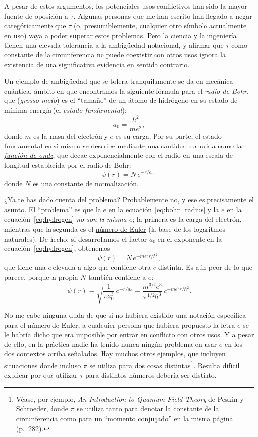 A pesar de estos argumentos, los potenciales usos conflictivos han sido la mayor fuente de oposición a $\tau$. Algunas personas que me han escrito han llegado a negar categóricamente que $\tau$ (o, presumiblemente, cualquier otro símbolo actualmente en uso) vaya a poder superar estos problemas. Pero la ciencia y la ingeniería tienen una elevada tolerancia a la ambigüedad notacional, y afirmar que $\tau$ como constante de la circunferencia no puede coexistir con otros usos ignora la existencia de una significativa evidencia en sentido contrario.

Un ejemplo de  ambigüedad que se tolera tranquilamente se da en mecánica cuántica, ámbito en que encontramos la siguiente fórmula para el  \emph{radio de Bohr}, que (\textit{grosso modo}) es el ``tamaño'' de un átomo de hidrógeno en su estado de mínima energía (el \emph{estado fundamental}):
\begin{equation}
  \label{eq:bohr_radius}
  a_0 = \frac{\hbar^2}{m e^2},
  \end{equation}
donde $m$ es la masa del electrón y $e$ es su carga. Por su parte, el estado fundamental en sí mismo se describe mediante una cantidad conocida como la \href{https://es.wikipedia.org/wiki/Función_de_onda}{\emph{función de onda}}, que decae exponencialmente con el radio en una escala de longitud establecida por el radio de Bohr:
\begin{equation}
\label{eq:hydrogen}
\psi(r) = N\,e^{-r/a_0},
\end{equation}
donde $N$ es una constante de normalización.

¿Ya te has dado cuenta del problema? Probablemente no, y ese es precisamente el asunto. El ``problema'' es que la $e$ en la ecuación~\eqref{eq:bohr_radius} y la $e$ en la ecuación~\eqref{eq:hydrogen} \emph{no son la misma $e$}; la primera es la carga del electrón, mientras que la segunda es el \href{https://es.wikipedia.org/wiki/N%C3%BAmero_e}{número de Euler} (la base de los logaritmos naturales). De hecho, si desarrollamos el factor $a_0$ en el exponente en la ecuación~\eqref{eq:hydrogen}, obtenemos
\[
\psi(r) = N\,e^{-m e^2 r/\hbar^2},
\]
que tiene una $e$ elevada a algo que contiene otra $e$ distinta. Es aún peor de lo que parece, porque la propia $N$ también contiene a $e$:
\[
\psi(r) = \sqrt{\frac{1}{\pi a_0^3}}\,e^{-r/a_0} =
\frac{m^{3/2} e^3}{\pi^{1/2} \hbar^3}\,e^{-m e^2 r/\hbar^2}.
\]

No me cabe ninguna duda de que si no hubiera existido una notación específica para el número de Euler, a cualquier persona que hubiera propuesto la letra $e$ se le habría dicho que era imposible por entrar en conflicto con otros usos. Y a pesar de ello, en la práctica nadie ha tenido nunca ningún problema en usar $e$ en los dos contextos arriba señalados. Hay muchos otros ejemplos, que incluyen situaciones donde incluso $\pi$ se utiliza para dos cosas distintas\footnote{Véase, por ejemplo, \emph{An Introduction to Quantum Field Theory} de Peskin y Schroeder, donde $\pi$ se utiliza tanto para denotar la constante de la circunferencia como para un ``momento conjugado'' en la misma página (p.~282).}. Resulta difícil explicar por qué utilizar $\tau$ para distintos números debería ser distinto.

